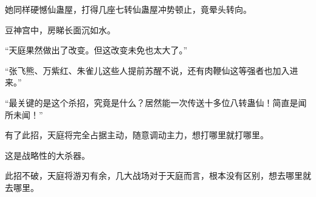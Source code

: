 \begin{this_body}
她同样硬憾仙蛊屋，打得几座七转仙蛊屋冲势顿止，竟晕头转向。

豆神宫中，房睇长面沉如水。

“天庭果然做出了改变。但这改变未免也太大了。”

“张飞熊、万紫红、朱雀儿这些人提前苏醒不说，还有肉鞭仙这等强者也加入进来。”

“最关键的是这个杀招，究竟是什么？居然能一次传送十多位八转蛊仙！简直是闻所未闻！”

有了此招，天庭将完全占据主动，随意调动主力，想打哪里就打哪里。

这是战略性的大杀器。

此招不破，天庭将游刃有余，几大战场对于天庭而言，根本没有区别，想去哪里就去哪里。

\end{this_body}

